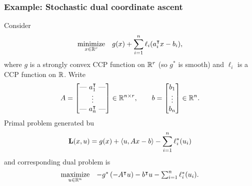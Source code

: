 \documentclass[10pt,mathserif]{beamer}
\begin{document}
\begin{frame}
\frametitle{Example: Stochastic dual coordinate ascent}
Consider 
\begin{align*}
\begin{array}{ll}
\underset{x\in \mathbb{R}^r}{\mbox{minimize}}& \displaystyle{g(x) + \sum_{i=1}^{n} \ell_i(a_i^\intercal x - b_i)},
  \end{array}
\end{align*}
where $g$ is a strongly convex CCP function on $\mathbb{R}^r$ (so $g^*$ is smooth)
and $\ell_i$ is a CCP function on $\mathbb{R}$.
Write
\begin{align*}
  A = \begin{bmatrix}
        \text{---}~ a_1^\intercal ~\text{---}\\
         \vdots \\
        \text{---}~ a_n^\intercal ~\text{---}
       \end{bmatrix} \in\mathbb{R}^{n\times r},
       \qquad
       b= \begin{bmatrix}
        b_1\\\vdots\\b_n
       \end{bmatrix} \in\mathbb{R}^{n}.
\end{align*}
Primal problem generated bu
\[
\mathbf{L}(x,u)=g(x)+\langle u,Ax-b\rangle -\sum_{i=1}^{n}\ell_i^*(u_i)
\]
and corresponding dual problem is
\begin{align*}
\begin{array}{ll}
\underset{u\in \mathbb{R}^n}{\mbox{maximize}}& -g^*\left(-A^\intercal u\right)-b^\intercal u -\sum_{i=1}^{n}\ell_i^*(u_i).
    \end{array}
\end{align*}
\end{frame}
\end{document}

